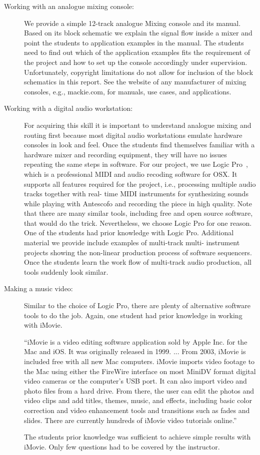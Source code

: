 \documentclass[onecolumn,nocopyrightspace,preprint]{sigplanconf}
\begin{document}
\begin{description}
\item[Working with an analogue mixing console:] We provide a simple 12-track
analogue Mixing console and its manual. Based on its block schematic we
explain the signal flow inside a mixer and point the students to application
examples in the manual. The students need to find out which of the application
examples fits the requirement of the project and how to set up the console
accordingly under supervision. Unfortunately, copyright limitations do not
allow for inclusion of the block schematics in this report. See the website of
any manufacturer of mixing consoles, e.g., mackie.com, for manuals, use cases,
and applications.

\item[Working with a digital audio workstation:] For acquiring this skill it
is important to understand analogue mixing and routing first because most
digital audio workstations emulate hardware consoles in look and feel. Once
the students find themselves familiar with a hardware mixer and recording
equipment, they will have no issues repeating the same steps in software. For
our project, we use Logic Pro~\cite{website:logic}, which is a professional
MIDI and audio recoding software for OSX. It supports all features required
for the project, i.e., processing multiple audio tracks together with real-
time MIDI instruments for synthesizing sounds while playing with Antescofo and
recording the piece in high quality.  Note that there are many similar tools,
including free and open source software, that would do the trick.
Nevertheless, we choose Logic Pro for one reason. One of the students had
prior knowledge with Logic Pro. Additional material we provide include
examples of multi-track multi- instrument projects showing the non-linear
production process of software sequencers. Once the students learn the work
flow of multi-track audio production, all tools suddenly look similar.

\item[Making a music video:] Similar to the choice of Logic Pro, there are
plenty of alternative software tools to do the job. Again, one student had
prior knowledge in working with iMovie.

``iMovie is a video editing software application sold by Apple Inc. for the Mac
and iOS. It was originally released in 1999. ... From 2003, iMovie is included
free with all new Mac computers. iMovie imports video footage to the Mac using
either the FireWire interface on most MiniDV format digital video cameras or
the computer's USB port. It can also import video and photo files from a hard
drive. From there, the user can edit the photos and video clips and add
titles, themes, music, and effects, including basic color correction and video
enhancement tools and transitions such as fades and slides. There are
currently hundreds of iMovie video tutorials online.''~\cite{website:imovie}

The students prior knowledge was sufficient to achieve simple results with
iMovie. Only few questions had to be covered by the instructor.

\end{description}
\end{document}
